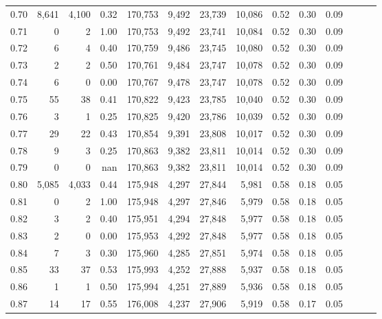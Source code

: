 \begin{tabular}{rrrrrrrrrrrrrr}
0.70 &   8,641 &  4,100 &  0.32 &  170,753 &    9,492 &  23,739 &  10,086 &  0.52 &  0.30 &      0.09 \\
0.71 &       0 &      2 &  1.00 &  170,753 &    9,492 &  23,741 &  10,084 &  0.52 &  0.30 &      0.09 \\
0.72 &       6 &      4 &  0.40 &  170,759 &    9,486 &  23,745 &  10,080 &  0.52 &  0.30 &      0.09 \\
0.73 &       2 &      2 &  0.50 &  170,761 &    9,484 &  23,747 &  10,078 &  0.52 &  0.30 &      0.09 \\
0.74 &       6 &      0 &  0.00 &  170,767 &    9,478 &  23,747 &  10,078 &  0.52 &  0.30 &      0.09 \\
0.75 &      55 &     38 &  0.41 &  170,822 &    9,423 &  23,785 &  10,040 &  0.52 &  0.30 &      0.09 \\
0.76 &       3 &      1 &  0.25 &  170,825 &    9,420 &  23,786 &  10,039 &  0.52 &  0.30 &      0.09 \\
0.77 &      29 &     22 &  0.43 &  170,854 &    9,391 &  23,808 &  10,017 &  0.52 &  0.30 &      0.09 \\
0.78 &       9 &      3 &  0.25 &  170,863 &    9,382 &  23,811 &  10,014 &  0.52 &  0.30 &      0.09 \\
0.79 &       0 &      0 &   nan &  170,863 &    9,382 &  23,811 &  10,014 &  0.52 &  0.30 &      0.09 \\
0.80 &   5,085 &  4,033 &  0.44 &  175,948 &    4,297 &  27,844 &   5,981 &  0.58 &  0.18 &      0.05 \\
0.81 &       0 &      2 &  1.00 &  175,948 &    4,297 &  27,846 &   5,979 &  0.58 &  0.18 &      0.05 \\
0.82 &       3 &      2 &  0.40 &  175,951 &    4,294 &  27,848 &   5,977 &  0.58 &  0.18 &      0.05 \\
0.83 &       2 &      0 &  0.00 &  175,953 &    4,292 &  27,848 &   5,977 &  0.58 &  0.18 &      0.05 \\
0.84 &       7 &      3 &  0.30 &  175,960 &    4,285 &  27,851 &   5,974 &  0.58 &  0.18 &      0.05 \\
0.85 &      33 &     37 &  0.53 &  175,993 &    4,252 &  27,888 &   5,937 &  0.58 &  0.18 &      0.05 \\
0.86 &       1 &      1 &  0.50 &  175,994 &    4,251 &  27,889 &   5,936 &  0.58 &  0.18 &      0.05 \\
0.87 &      14 &     17 &  0.55 &  176,008 &    4,237 &  27,906 &   5,919 &  0.58 &  0.17 &      0.05 \\

\end{tabular}
